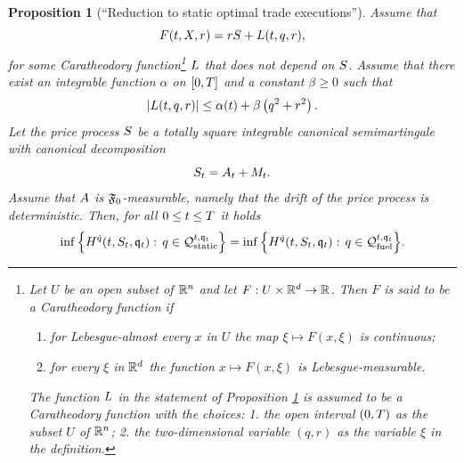 \documentclass[10pt,a4paper]{article}
\newtheorem{prop}[thm]{Proposition}
\begin{document}
	
	\begin{prop}[``Reduction to static optimal trade executions'']\label{prop.reductionToStaticSolution}
		Assume that 
		\begin{equation}\label{eq.decompositionOfLagrangian}
		F(t,X,r) = rS + L(t,q,r),
		\end{equation}
		for some Caratheodory function\footnote{
			Let $U$ be an open subset of $\mathbb{R}^{n}$ and let $F:U\times\mathbb{R}^{d} \rightarrow \mathbb{R}$. Then $F$ is said to be a Caratheodory function if
			\begin{enumerate}
				\item for Lebesgue-almost every $x$ in $U$ the map $\xi \mapsto F(x,\xi)$ is continuous;
				\item for every $\xi$ in $\mathbb{R}^{d}$ the function $x\mapsto F(x,\xi)$ is Lebesgue-measurable. 
			\end{enumerate}
			The function $L$ in the statement of Proposition \ref{prop.reductionToStaticSolution} is assumed to be a Caratheodory function with the choices: 1. the open interval $(0,T)$ as the subset $U$ of $\mathbb{R}^{n}$; 2. the two-dimensional variable $(q,r)$ as the variable  $\xi$ in the definition.
			}
		$L$ that does not depend on $S$. Assume  that there exist an integrable function $\alpha$ on ${[0,T]}$  and a constant $\beta \geq 0$ such that 
		\begin{equation*}
		\left\lvert {L(t,q,r)} \right\rvert \leq \alpha(t) + \beta \left(q^{2} + r ^{2} \right).
		\end{equation*}
		Let the price process $S$ be a totally square integrable canonical semimartingale with canonical decomposition  
		\begin{equation}\label{eq.evolutionOfFundamentalPrice}
		S_t = A_t + M_t.
		\end{equation}
		Assume that $A$ is $\mathfrak{F}_0$-measurable, namely that the drift of the price process is deterministic. 
		Then, for all $0\leq t\leq T$ it holds
		\begin{equation*}
		\inf \Big\lbrace H^{\dot{q}} (t,S_t,\mathfrak{q}_t) : \, q \in \mathcal{Q}_{\text{static}}^{t,\mathfrak{q}_t} \Big\rbrace
		= \inf \Big\lbrace 
		H^{\dot{q}} (t,S_t,\mathfrak{q}_t) : \, q \in \mathcal{Q}_{\text{fuel}}^{t,\mathfrak{q}_t} \Big\rbrace.
		\end{equation*}
	\end{prop}
	
\end{document}
